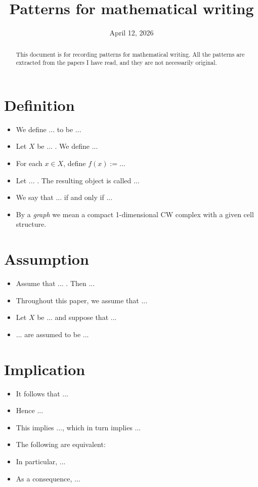 \documentclass[11pt]{amsart}
\title{Patterns for mathematical writing}
\date{April 12, 2026}
\begin{document}
\maketitle

\begin{abstract}
    This document is for recording patterns for mathematical writing.
    All the patterns are extracted from the papers I have read, and they are not necessarily original.
\end{abstract}

\newpage
\section*{Definition}

\begin{itemize}
    \item We define ... to be ...
    \item Let $X$ be ... . We define ... 
    \item For each $x \in X$, define $f(x) := $...
    \item Let ... . The resulting object is called ...
    \item We say that ... if and only if ... 
    \item By a \textit{graph} we mean a compact 1-dimensional CW complex with a given cell structure.
\end{itemize}


\newpage
\section*{Assumption}

\begin{itemize}
    \item Assume that ... . Then ...
    \item Throughout this paper, we assume that ...
    \item Let $X$ be ... and suppose that ...
    \item ... are assumed to be ... 
\end{itemize}


\newpage
\section*{Implication}

\begin{itemize}
    \item It follows that ...
    \item Hence ...
    \item This implies ..., which in turn implies ...
    \item The following are equivalent:
    \item In particular, ...
    \item As a consequence, ... 
\end{itemize}
\end{document}
